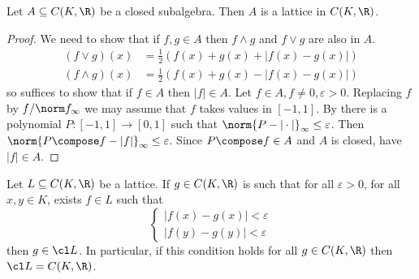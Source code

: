 \documentclass[a4paper]{article}
\begin{document}
\begin{lemma}
  Let \(A \subseteq C(K, \R)\) be a closed subalgebra. Then \(A\) is a lattice in \(C(K, \R)\).
\end{lemma}

\begin{proof}
  We need to show that if \(f, g \in A\) then \(f \wedge g\) and \(f \vee g\) are also in \(A\).
  \begin{align*}
    (f \vee g) (x) &= \frac{1}{2} (f(x) + g(x) + |f(x) - g(x)|) \\
    (f \wedge g) (x) &= \frac{1}{2} (f(x) + g(x) - |f(x) - g(x)|)
  \end{align*}
  so suffices to show that if \(f \in A\) then \(|f| \in A\). Let \(f \in A, f \neq 0, \varepsilon > 0\). Replacing \(f\) by \(f/\norm f_\infty\) we may assume that \(f\) takes values in \([-1, 1]\). By  there is a polynomial \(P: [-1, 1] \to [0, 1]\) such that \(\norm{P - |\cdot|}_\infty \leq \varepsilon\). Then \(\norm{P \compose f - |f|}_\infty \leq \varepsilon\). Since \(P \compose f \in A\) and \(A\) is closed, have \(|f| \in A\).
\end{proof}

\begin{lemma}
  \label{lem:lattice}
  Let \(L \subseteq C(K, \R)\) be a lattice. If \(g \in C(K, \R)\) is such that for all \(\varepsilon > 0\), for all \(x, y \in K\), exists \(f \in L\) such that
  \[
    \label{eqn:lattice}
    \left\{
      \begin{array}{l}
        |f(x) - g(x)| < \varepsilon \\
        |f(y) - g(y)| < \varepsilon
      \end{array}
    \right.
    \tag{\ast}
  \]
  then \(g \in \cl L\). In particular, if this condition holds for all \(g \in C(K, \R)\) then \(\cl L = C(K, \R)\).
\end{lemma}
\end{document}
